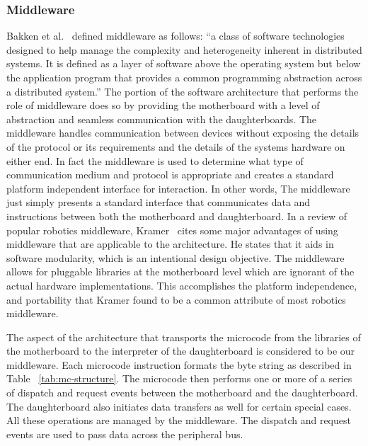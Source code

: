 	\subsubsection{Middleware} %
	\label{ssub:middleware}
	Bakken et al.~\parencite{bakken2001middleware} defined middleware as follows: ``a class of software technologies designed to help manage the complexity and heterogeneity inherent in distributed systems. It is defined as a layer of software above the operating system but below the application program that provides a common programming abstraction across a distributed system.'' The portion of the \xten software architecture that performs the role of middleware does so by providing the motherboard with a level of abstraction and seamless communication with the daughterboards. The middleware handles communication between devices without exposing the details of the protocol or its requirements and the details of the systems hardware on either end. In fact the middleware is used to determine what type of communication medium and protocol is appropriate and creates a standard platform independent interface for interaction. In other words, The middleware just simply presents a standard interface that communicates data and instructions between both the motherboard and daughterboard.
	In a review of popular robotics middleware, Kramer~\parencite{kramer} cites some major advantages of using middleware that are applicable to the \xten architecture. He states that it aids in software modularity, which is an intentional design objective. The middleware allows for pluggable libraries at the motherboard level which are ignorant of the actual hardware implementations. This accomplishes the platform independence, and portability that Kramer found to be a common attribute of most robotics middleware.
	
	The aspect of the \xten architecture that transports the microcode from the libraries of the motherboard to the interpreter of the daughterboard is considered to be our middleware. Each microcode instruction formats the byte string as described in Table ~\ref{tab:mc-structure}. The microcode then performs one or more of a series of dispatch and request events between the motherboard and the daughterboard. The daughterboard also initiates data transfers as well for certain special cases. All these operations are managed by the middleware. The dispatch and request events are used to pass data across the peripheral bus.


	
